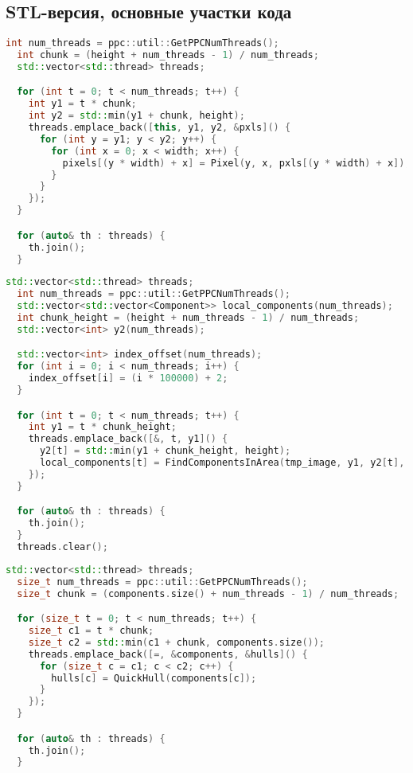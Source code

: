 \documentclass[12pt]{article}
\begin{document}
\newpage

\subsection{STL-версия, основные участки кода}
\label{appendix:stl_1}
\begin{lstlisting}[language=C++, caption={STL-версия, Создание объекта Image в конструкторе Image::Image()}]
int num_threads = ppc::util::GetPPCNumThreads();
  int chunk = (height + num_threads - 1) / num_threads;
  std::vector<std::thread> threads;

  for (int t = 0; t < num_threads; t++) {
    int y1 = t * chunk;
    int y2 = std::min(y1 + chunk, height);
    threads.emplace_back([this, y1, y2, &pxls]() {
      for (int y = y1; y < y2; y++) {
        for (int x = 0; x < width; x++) {
          pixels[(y * width) + x] = Pixel(y, x, pxls[(y * width) + x]);
        }
      }
    });
  }

  for (auto& th : threads) {
    th.join();
  }
\end{lstlisting}
\label{appendix:stl_2}
\begin{lstlisting}[language=C++, caption={STL-версия, Поиск компонент по "полосам" изображения в функции FindComponentsSTL()}]
std::vector<std::thread> threads;
  int num_threads = ppc::util::GetPPCNumThreads();
  std::vector<std::vector<Component>> local_components(num_threads);
  int chunk_height = (height + num_threads - 1) / num_threads;
  std::vector<int> y2(num_threads);

  std::vector<int> index_offset(num_threads);
  for (int i = 0; i < num_threads; i++) {
    index_offset[i] = (i * 100000) + 2;
  }

  for (int t = 0; t < num_threads; t++) {
    int y1 = t * chunk_height;
    threads.emplace_back([&, t, y1]() {
      y2[t] = std::min(y1 + chunk_height, height);
      local_components[t] = FindComponentsInArea(tmp_image, y1, y2[t], index_offset[t]);
    });
  }

  for (auto& th : threads) {
    th.join();
  }
  threads.clear();
\end{lstlisting}
\label{appendix:stl_3}
\begin{lstlisting}[language=C++, caption={STL-версия, Построение оболочки для каждой из компонент в функции QuickHullAllSTL()}]
  std::vector<std::thread> threads;
  size_t num_threads = ppc::util::GetPPCNumThreads();
  size_t chunk = (components.size() + num_threads - 1) / num_threads;

  for (size_t t = 0; t < num_threads; t++) {
    size_t c1 = t * chunk;
    size_t c2 = std::min(c1 + chunk, components.size());
    threads.emplace_back([=, &components, &hulls]() {
      for (size_t c = c1; c < c2; c++) {
        hulls[c] = QuickHull(components[c]);
      }
    });
  }

  for (auto& th : threads) {
    th.join();
  }
\end{lstlisting}
\end{document}

